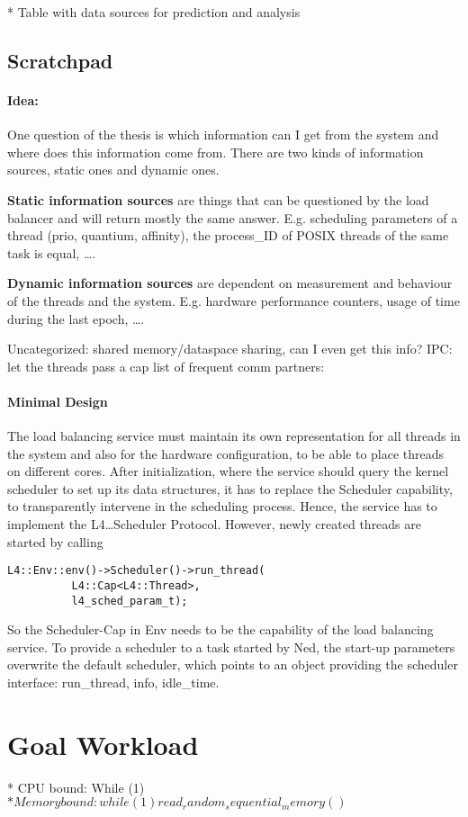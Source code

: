 * Table with data sources for prediction and analysis


\subsection{Scratchpad}
\paragraph{Idea:}
One question of the thesis is which information can I get
from the system and where does this information come from.
There are two kinds of information sources, static ones and dynamic ones.

\textbf{Static information sources} are things that can be questioned by the load
balancer and will return mostly the same answer.
E.g. scheduling parameters of a thread (prio, quantium, affinity),
the process\_ID of POSIX threads of the same task is equal,
\ldots{}.

\textbf{Dynamic information sources} are dependent on measurement and behaviour of the
threads and the system.
E.g. hardware performance counters,
usage of time during the last epoch,
\ldots{}.

Uncategorized: shared memory/dataspace sharing, can I even get this info?
IPC: let the threads pass a cap list of frequent comm partners:

\paragraph{Minimal Design}
The load balancing service must maintain its own representation for all threads
in the system and also for the hardware configuration, to be able to place
threads on different cores.
After initialization, where the service should query the kernel scheduler to
set up its data structures, it has to replace the Scheduler capability, to
transparently intervene in the scheduling process.
Hence, the service has to implement the L4\dots{}Scheduler Protocol.
However, newly created threads are started by calling
\begin{verbatim}
L4::Env::env()->Scheduler()->run_thread(
	      L4::Cap<L4::Thread>,
	      l4_sched_param_t);
\end{verbatim}
So the Scheduler-Cap in Env needs to be the capability of the load balancing
service.
To provide a scheduler to a task started by Ned, the start-up parameters
overwrite the default scheduler, which points
to an object providing the scheduler interface: run\_thread, info, idle\_time.








\section{Goal Workload}

* CPU bound: While (1)
$* Memory bound: while (1) read_random_sequential_memory ()$


\cleardoublepage

